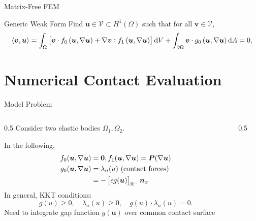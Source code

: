 \documentclass{cubeamer}
\newlength{\textheightwithtitle}
\newcommand{\abr}[1]{\left\langle {#1} \right\rangle}
\begin{document}
\begin{frame}{Matrix-Free FEM}
\begin{block}{Generic Weak Form}
    Find $\bm u\in \mathcal{V}\subset H^1(\Omega)$ such that for all $\bm v \in\mathcal{V}$,
    \begin{equation*}
        \abr{\bm v, \bm u} = \int_{\Omega} \sbr{\bm v \cdot f_0 \del{\bm u, \nabla \bm u} + \nabla \bm v : f_1\del{\bm u, \nabla \bm u}} \dif V + \int_{\partial \Omega} \bm v \cdot g_{0} \del{\bm u, \nabla \bm u} \dif A = 0,
    \end{equation*}
\end{block}
\end{frame}

\section{Numerical Contact Evaluation}

\begin{frame}{Model Problem}
\begin{columns}
    \begin{column}{0.5\textwidth}
        Consider two elastic bodies $\Omega_1, \Omega_2$.
        
        In the following,
        \begin{align*}
            f_0(\bm u, \nabla \bm u) &= \bm 0, f_1(\bm u, \nabla \bm u) = \bm P(\nabla \bm u)\\
            g_0(\bm u, \nabla \bm u) &= \lambda_n(u) \text{ (contact forces)}\\
            &= -\sbr{\epsilon g(\bm u)}_{\mathbb{R}^-} \bm{n}_x
        \end{align*}
        In general, KKT conditions:
        \[
        g(u) \geq 0,\quad \lambda_n(u) \geq 0, \quad g(u) \cdot \lambda_n(u) = 0. 
        \]
        Need to \alert{integrate} gap function $g(\bm u)$ over \alert{common contact surface}
    \end{column}
    \begin{column}{0.5\textwidth}
        \centering
        
    \end{column}
\end{columns}
\end{frame}
\end{document}
